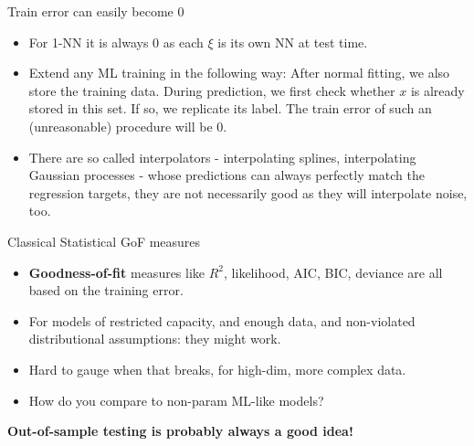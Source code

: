 \documentclass[11pt,compress,t,notes=noshow, xcolor=table]{beamer}
\begin{document}
\begin{vbframe}{Train error can easily become 0}


\begin{itemize}
    \item For 1-NN it is always 0 as each $\xi$ is its own NN at test time.
  \item Extend any ML training in the following way:
    After normal fitting, we also store the training data.
    During prediction, we first check whether $x$ is already stored in this set. 
    If so, we replicate its label.
    The train error of such an (unreasonable) procedure will be 0.
  \item There are so called interpolators - interpolating 
  splines, interpolating Gaussian processes - whose predictions can always 
  perfectly match the regression targets, they are not necessarily good as they 
  will interpolate noise, too.
\end{itemize}
\end{vbframe}


\begin{vbframe}{Classical Statistical GoF measures}

\begin{itemize}
  \item \textbf{Goodness-of-fit} measures like $R^2$, likelihood, AIC, 
  BIC, deviance are all based on the training error.
  \item For models of restricted capacity, and enough data, 
      and non-violated distributional assumptions: 
      they might work.
  \item Hard to gauge when that breaks, for high-dim, more complex data.
  \item How do you compare to non-param ML-like models?
\end{itemize}

\vfill

\textbf{Out-of-sample testing is probably always a good idea!}

\end{vbframe}




\endlecture
\end{document}
